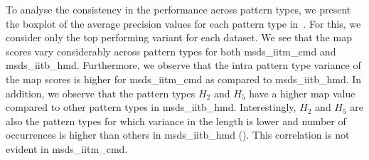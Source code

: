 To analyse the consistency in the performance across pattern types, we present the boxplot of the average precision values for each pattern type in~. For this, we consider only the top performing variant for each dataset. We see that the \gls{map} scores vary considerably across pattern types for both \acrshort{msds_iitm_cmd} and \acrshort{msds_iitb_hmd}. Furthermore, we observe that the intra pattern type variance of the \gls{map} scores is higher for \acrshort{msds_iitm_cmd} as compared to \acrshort{msds_iitb_hmd}. In addition, we observe that the pattern types $H_2$ and $H_5$ have a higher \gls{map} value compared to other pattern types in \acrshort{msds_iitb_hmd}. Interestingly, $H_2$ and $H_5$ are also the pattern types for which variance in the length is lower and number of occurrences is higher than others in \acrshort{msds_iitb_hmd} (). This correlation is not evident in \acrshort{msds_iitm_cmd}.


